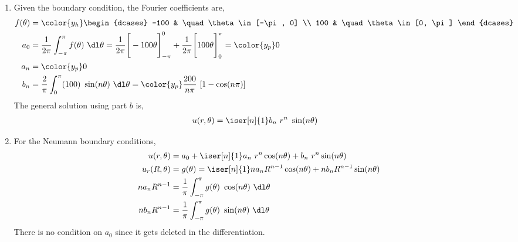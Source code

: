 \begin{enumerate}
\begin{enumerate}
              \item Given the boundary condition, the Fourier coefficients are,
                    \begin{align}
                        f(\theta) & = \color{y_h}
                        \begin{dcases}
                            -100 & \quad \theta \in [-\pi, 0] \\
                            100  & \quad \theta \in [0, \pi]
                        \end{dcases}                              \\
                        a_0       & = \frac{1}{2\pi} \int_{-\pi}^{\pi} f(\theta)
                        \ \dl \theta
                        = \frac{1}{2\pi} \Bigg[ -100\theta \Bigg]_{-\pi}^0
                        + \frac{1}{2\pi} \Bigg[ 100\theta \Bigg]_0^\pi = \color{y_p} 0 \\
                        a_n       & = \color{y_p} 0                                    \\
                        b_n       & = \frac{2}{\pi} \int_{0}^{\pi} (100)
                        \ \sin(n\theta)\ \dl \theta
                        = \color{y_p} \frac{200}{n\pi}\ [1 - \cos(n\pi)]
                    \end{align}
                    The general solution using part $ b $ is,
                    \begin{align}
                        u(r, \theta) & = \iser[n]{1} b_n\ r^n\ \sin(n\theta)
                    \end{align}

              \item For the Neumann boundary conditions,
                    \begin{align}
                        u(r, \theta)   & = a_0 + \iser[n]{1} a_n\ r^n  \cos(n\theta)
                        + b_n\ r^n \sin(n\theta)                                     \\
                        u_r(R, \theta) & = g(\theta) = \iser[n]{1} na_nR^{n-1}
                        \cos(n\theta) + nb_nR^{n-1} \sin(n\theta)                    \\
                        na_nR^{n-1}    & = \frac{1}{\pi} \int_{-\pi}^{\pi}
                        g(\theta)\ \cos(n\theta)\ \dl \theta                         \\
                        nb_nR^{n-1}    & = \frac{1}{\pi} \int_{-\pi}^{\pi}
                        g(\theta)\ \sin(n\theta)\ \dl \theta
                    \end{align}
                    There is no condition on $ a_0 $ since it gets deleted in the
                    differentiation.


\end{enumerate}
\end{enumerate}
